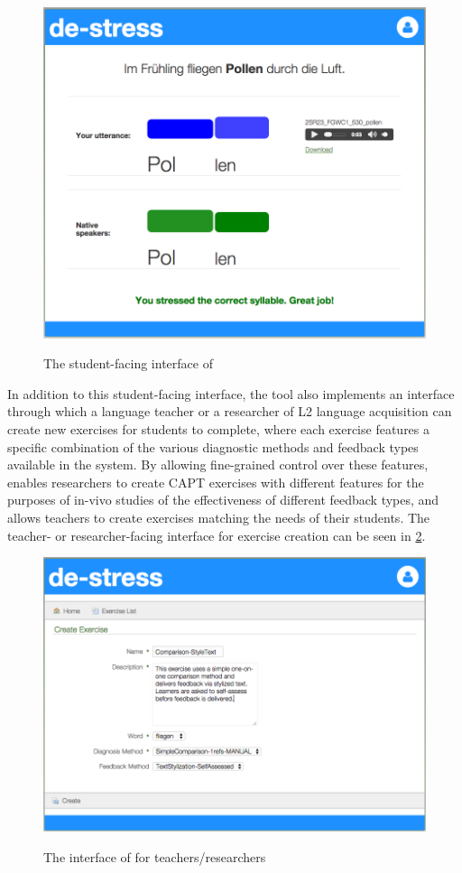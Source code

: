 	\begin{figure}
		\centering
		\caption{The student-facing interface of }
		\includegraphics[width=.9\textwidth]{img/screenshots/StudentInterface-userIcon}
		\label{fig:interface:student}
	\end{figure}

In addition to this student-facing interface, the tool also implements an interface through which a language teacher or a researcher of L2 language acquisition can create new exercises for students to complete, where each exercise features a specific combination of the various diagnostic methods and feedback types available in the system. By allowing fine-grained control over these features,  enables researchers to create CAPT exercises with different features for the purposes of in-vivo studies of the effectiveness of different feedback types, and allows teachers to create exercises matching the needs of their students. The teacher- or researcher-facing interface for exercise creation can be seen in \cref{fig:interface:teacher}.

	\begin{figure}
		\centering
		\caption{The interface of  for teachers/researchers}
		\includegraphics[width=.9\textwidth]{img/screenshots/TeacherInterface-userIcon}
		\label{fig:interface:teacher}
	\end{figure}

